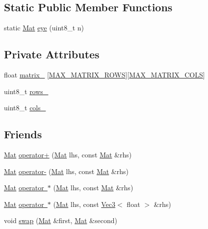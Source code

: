 \subsection*{Static Public Member Functions}
\begin{DoxyCompactItemize}
\item 
static \mbox{\hyperlink{class_mat}{Mat}} \mbox{\hyperlink{class_mat_ab02af947644cba411f97e1459485b67d}{eye}} (uint8\+\_\+t n)
\end{DoxyCompactItemize}
\subsection*{Private Attributes}
\begin{DoxyCompactItemize}
\item 
float \mbox{\hyperlink{class_mat_a7753c4dcb04086512d8049d0207e9815}{matrix\+\_\+}} \mbox{[}\mbox{\hyperlink{mat_8h_a1513f6941a3ccf82f3c3848e91860285}{M\+A\+X\+\_\+\+M\+A\+T\+R\+I\+X\+\_\+\+R\+O\+WS}}\mbox{]}\mbox{[}\mbox{\hyperlink{mat_8h_a6df08808870b848d8ab21bf57288c748}{M\+A\+X\+\_\+\+M\+A\+T\+R\+I\+X\+\_\+\+C\+O\+LS}}\mbox{]}
\item 
uint8\+\_\+t \mbox{\hyperlink{class_mat_aad27e7e5a9e5672a3ae21493892fc67e}{rows\+\_\+}}
\item 
uint8\+\_\+t \mbox{\hyperlink{class_mat_af7abe041c4852f35dd45c4c65523b130}{cols\+\_\+}}
\end{DoxyCompactItemize}
\subsection*{Friends}
\begin{DoxyCompactItemize}
\item 
\mbox{\hyperlink{class_mat}{Mat}} \mbox{\hyperlink{class_mat_a6eec07eb288b59dcb2a27a63453ddad0}{operator+}} (\mbox{\hyperlink{class_mat}{Mat}} lhs, const \mbox{\hyperlink{class_mat}{Mat}} \&rhs)
\item 
\mbox{\hyperlink{class_mat}{Mat}} \mbox{\hyperlink{class_mat_a012d3be03352b7233247364175489564}{operator-\/}} (\mbox{\hyperlink{class_mat}{Mat}} lhs, const \mbox{\hyperlink{class_mat}{Mat}} \&rhs)
\item 
\mbox{\hyperlink{class_mat}{Mat}} \mbox{\hyperlink{class_mat_a13b58290a73861162c573130417e5e00}{operator $\ast$}} (\mbox{\hyperlink{class_mat}{Mat}} lhs, const \mbox{\hyperlink{class_mat}{Mat}} \&rhs)
\item 
\mbox{\hyperlink{class_mat}{Mat}} \mbox{\hyperlink{class_mat_aa3444bb36ff3148a88cae1dd8867a72a}{operator $\ast$}} (\mbox{\hyperlink{class_mat}{Mat}} lhs, const \mbox{\hyperlink{class_vec3}{Vec3}}$<$ float $>$ \&rhs)
\item 
void \mbox{\hyperlink{class_mat_a67468cb8d132dc0a2d02af527103d82e}{swap}} (\mbox{\hyperlink{class_mat}{Mat}} \&first, \mbox{\hyperlink{class_mat}{Mat}} \&second)
\end{DoxyCompactItemize}


